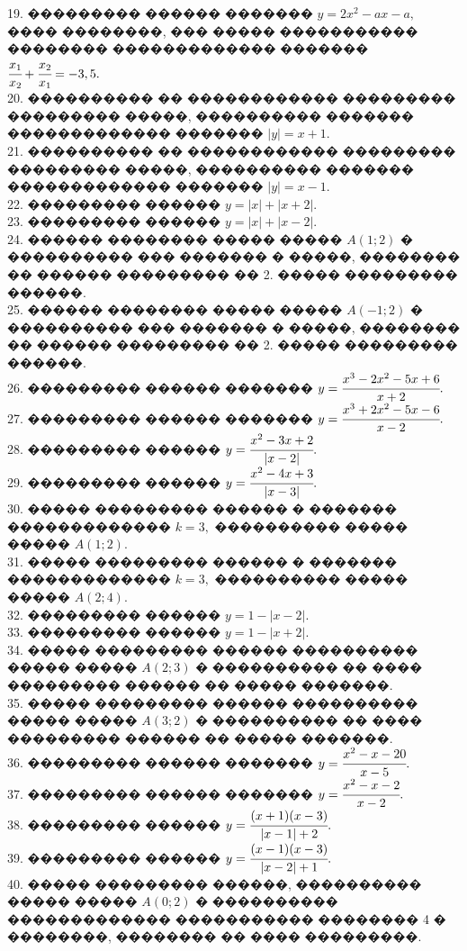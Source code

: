 \documentclass[12pt]{article}
\begin{document}
19. ��������� ������ ������� $y=2x^2-ax-a,$ ���� ��������, ��� ����� ����������� �������� ������������� ������� $\cfrac{x_1}{x_2}+\cfrac{x_2}{x_1}=-3,5.$\\
20. ���������� �� ������������ ��������� ��������� �����, ���������� ������� ������������� ������� $|y|=x+1.$\\
21. ���������� �� ������������ ��������� ��������� �����, ���������� ������� ������������� ������� $|y|=x-1.$\\
22. ��������� ������ $y=|x|+|x+2|.$\\
23. ��������� ������ $y=|x|+|x-2|.$\\
24. ������ �������� ����� ����� $A(1;2)$ � ���������� ��� ������� � �����, �������� �� ������ ��������� �� 2. ����� ��������� ������.\\
25. ������ �������� ����� ����� $A(-1;2)$ � ���������� ��� ������� � �����, �������� �� ������ ��������� �� 2. ����� ��������� ������.\\
26. ��������� ������ ������� $y=\cfrac{x^3-2x^2-5x+6}{x+2}.$\\
27. ��������� ������ ������� $y=\cfrac{x^3+2x^2-5x-6}{x-2}.$\\
28. ��������� ������ $y=\cfrac{x^2-3x+2}{|x-2|}.$\\
29. ��������� ������ $y=\cfrac{x^2-4x+3}{|x-3|}.$\\
30. ����� ��������� ������ � ������� ������������� $k=3,$ ���������� ����� ����� $A(1;2).$\\
31. ����� ��������� ������ � ������� ������������� $k=3,$ ���������� ����� ����� $A(2;4).$\\
32. ��������� ������ $y=1-|x-2|.$\\
33. ��������� ������ $y=1-|x+2|.$\\
34. ����� ��������� ������ ���������� ����� ����� $A(2;3)$ � ���������� �� ���� ��������� ������ �� ����� �������.\\
35. ����� ��������� ������ ���������� ����� ����� $A(3;2)$ � ���������� �� ���� ��������� ������ �� ����� �������.\\
36. ��������� ������ ������� $y=\cfrac{x^2-x-20}{x-5}.$\\
37. ��������� ������ ������� $y=\cfrac{x^2-x-2}{x-2}.$\\
38. ��������� ������ $y=\cfrac{(x+1)(x-3)}{|x-1|+2}.$\\
39. ��������� ������ $y=\cfrac{(x-1)(x-3)}{|x-2|+1}.$\\
40. ����� ��������� ������, ���������� ����� ����� $A(0;2)$ � ���������� ������������� ����������� �������� 4 � ��������, �������� �� ���� ���������.\\
\end{document}

